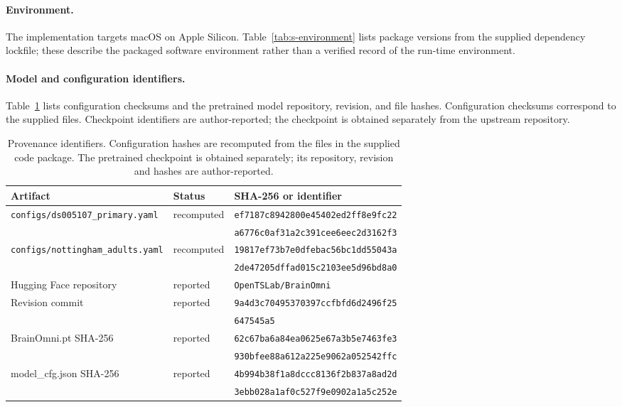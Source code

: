 \paragraph{Environment.}
The implementation targets macOS on Apple Silicon. Table~\ref{tab:s-environment}
lists package versions from the supplied dependency lockfile; these describe the
packaged software environment rather than a verified record of the run-time environment.

\paragraph{Model and configuration identifiers.}
Table~\ref{tab:s-hashes} lists configuration checksums and the pretrained model
repository, revision, and file hashes. Configuration checksums correspond to the
supplied files. Checkpoint identifiers are author-reported; the checkpoint is
obtained separately from the upstream repository.

\begin{table}[htbp]\centering\small
\begin{tabular}{lll}
\toprule
Artifact & Status & SHA-256 or identifier \\
\midrule
\texttt{configs/ds005107\_primary.yaml} & recomputed & \texttt{ef7187c8942800e45402ed2ff8e9fc22} \\
 & & \texttt{a6776c0af31a2c391cee6eec2d3162f3} \\
\texttt{configs/nottingham\_adults.yaml} & recomputed & \texttt{19817ef73b7e0dfebac56bc1dd55043a} \\
 & & \texttt{2de47205dffad015c2103ee5d96bd8a0} \\
\midrule
Hugging Face repository & reported & \texttt{OpenTSLab/BrainOmni} \\
Revision commit & reported & \texttt{9a4d3c70495370397ccfbfd6d2496f25} \\
 & & \texttt{647545a5} \\
BrainOmni.pt SHA-256 & reported & \texttt{62c67ba6a84ea0625e67a3b5e7463fe3} \\
 & & \texttt{930bfee88a612a225e9062a052542ffc} \\
model\_cfg.json SHA-256 & reported & \texttt{4b994b38f1a8dccc8136f2b837a8ad2d} \\
 & & \texttt{3ebb028a1af0c527f9e0902a1a5c252e} \\
\bottomrule\end{tabular}
\caption{Provenance identifiers. Configuration hashes are recomputed from the files in the supplied code package. The pretrained checkpoint is obtained separately; its repository, revision and hashes are author-reported.}
\label{tab:s-hashes}\end{table}

